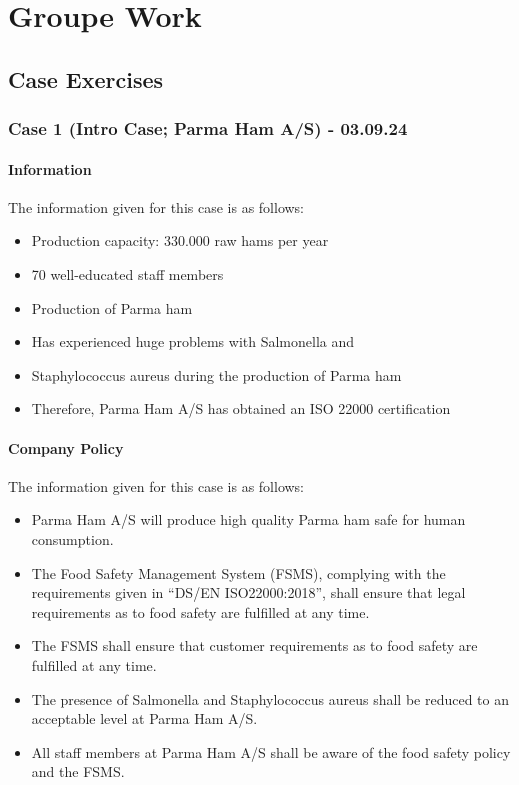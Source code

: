 \chapter{Groupe Work}

\section{Case Exercises}

\subsection{Case 1 (Intro Case; Parma Ham A/S) - 03.09.24}


\subsubsection*{Information}
\begin{highlight}
    The information given for this case is as follows:

\begin{itemize}
\item Production capacity: 330.000 raw hams per year
\item 70 well-educated staff members
\item Production of Parma ham
\item Has experienced huge problems with Salmonella and
\item Staphylococcus aureus during the production of Parma ham
\item Therefore, Parma Ham A/S has obtained an ISO 22000
certification

\end{itemize}
\end{highlight}


\subsubsection*{Company Policy}
\begin{highlight}
    The information given for this case is as follows:

\begin{itemize}
\item Parma Ham A/S will produce high quality Parma ham safe for human consumption.
\item The Food Safety Management System (FSMS), complying with the requirements given in “DS/EN ISO22000:2018”, shall ensure that legal requirements as to food safety are fulfilled at any time.
\item The FSMS shall ensure that customer requirements as to food safety are fulfilled at any time.
\item The presence of Salmonella and Staphylococcus aureus shall be reduced to an acceptable level at Parma Ham A/S.
\item All staff members at Parma Ham A/S shall be aware of the food safety policy and the FSMS.

\end{itemize}
\end{highlight}


